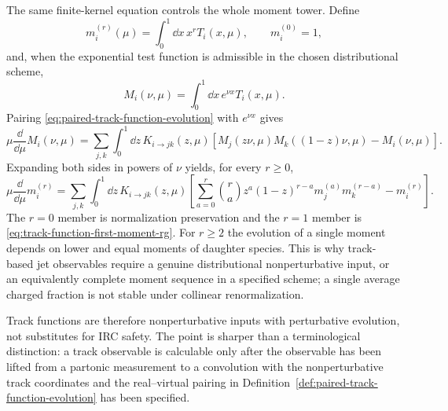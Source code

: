 The same finite-kernel equation controls the whole moment tower.  Define
\[
  m_i^{(r)}(\mu)=\int_0^1\dd x\,x^rT_i(x,\mu),
  \qquad
  m_i^{(0)}=1,
\]
and, when the exponential test function is admissible in the chosen
distributional scheme,
\[
  M_i(\nu,\mu)=\int_0^1\dd x\,e^{\nu x}T_i(x,\mu).
\]
Pairing \eqref{eq:paired-track-function-evolution} with \(e^{\nu x}\) gives
\begin{equation}
  \mu\frac{\dd}{\dd\mu}M_i(\nu,\mu)
  =
  \sum_{j,k}\int_0^1\dd z\,K_{i\to jk}(z,\mu)
  \left[
    M_j(z\nu,\mu)M_k((1-z)\nu,\mu)-M_i(\nu,\mu)
  \right].
  \label{eq:track-function-generating-rg}
\end{equation}
Expanding both sides in powers of \(\nu\) yields, for every \(r\geq0\),
\begin{equation}
  \mu\frac{\dd}{\dd\mu}m_i^{(r)}
  =
  \sum_{j,k}\int_0^1\dd z\,K_{i\to jk}(z,\mu)
  \left[
    \sum_{a=0}^{r}
    \binom{r}{a}
    z^a(1-z)^{r-a}
    m_j^{(a)}m_k^{(r-a)}
    -m_i^{(r)}
  \right].
  \label{eq:track-function-moment-tower-rg}
\end{equation}
The \(r=0\) member is normalization preservation and the \(r=1\) member is
\eqref{eq:track-function-first-moment-rg}.  For \(r\geq2\) the evolution of a
single moment depends on lower and equal moments of daughter species.  This
is why track-based jet observables require a genuine distributional
nonperturbative input, or an equivalently complete moment sequence in a
specified scheme; a single average charged fraction is not stable under
collinear renormalization.

Track functions are therefore nonperturbative inputs with perturbative
evolution, not substitutes for IRC safety.  The point is sharper than a
terminological distinction: a track observable is calculable only after the
observable has been lifted from a partonic measurement to a convolution with
the nonperturbative track coordinates and the real--virtual pairing in
Definition~\ref{def:paired-track-function-evolution} has been specified.

